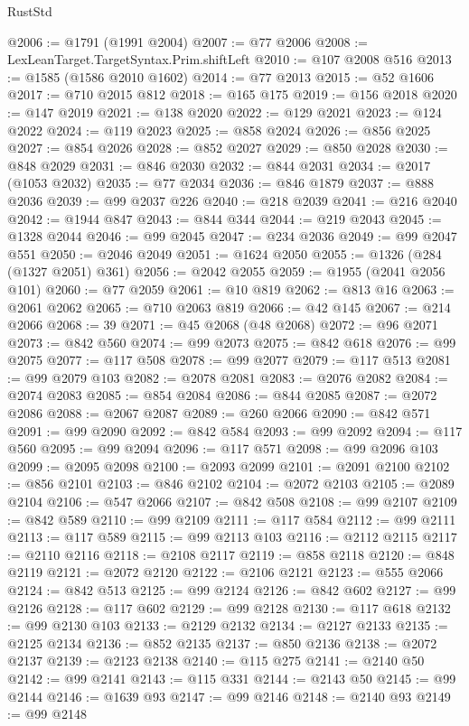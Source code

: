 \begin{lexlean}{RustStd}
\begin{coremodule}
@2006 := @1791 (@1991 @2004)
@2007 := @77 @2006
@2008 := LexLeanTarget.TargetSyntax.Prim.shiftLeft
@2010 := @107 @2008 @516
@2013 := @1585 (@1586 @2010 @1602)
@2014 := @77 @2013
@2015 := @52 @1606
@2017 := @710 @2015 @812
@2018 := @165 @175
@2019 := @156 @2018
@2020 := @147 @2019
@2021 := @138 @2020
@2022 := @129 @2021
@2023 := @124 @2022
@2024 := @119 @2023
@2025 := @858 @2024
@2026 := @856 @2025
@2027 := @854 @2026
@2028 := @852 @2027
@2029 := @850 @2028
@2030 := @848 @2029
@2031 := @846 @2030
@2032 := @844 @2031
@2034 := @2017 (@1053 @2032)
@2035 := @77 @2034
@2036 := @846 @1879
@2037 := @888 @2036
@2039 := @99 @2037 @226
@2040 := @218 @2039
@2041 := @216 @2040
@2042 := @1944 @847
@2043 := @844 @344
@2044 := @219 @2043
@2045 := @1328 @2044
@2046 := @99 @2045
@2047 := @234 @2036
@2049 := @99 @2047 @551
@2050 := @2046 @2049
@2051 := @1624 @2050
@2055 := @1326 (@284 (@1327 @2051) @361)
@2056 := @2042 @2055
@2059 := @1955 (@2041 @2056 @101)
@2060 := @77 @2059
@2061 := @10 @819
@2062 := @813 @16
@2063 := @2061 @2062
@2065 := @710 @2063 @819
@2066 := @42 @145
@2067 := @214 @2066
@2068 := 39
@2071 := @45 @2068 (@48 @2068)
@2072 := @96 @2071
@2073 := @842 @560
@2074 := @99 @2073
@2075 := @842 @618
@2076 := @99 @2075
@2077 := @117 @508
@2078 := @99 @2077
@2079 := @117 @513
@2081 := @99 @2079 @103
@2082 := @2078 @2081
@2083 := @2076 @2082
@2084 := @2074 @2083
@2085 := @854 @2084
@2086 := @844 @2085
@2087 := @2072 @2086
@2088 := @2067 @2087
@2089 := @260 @2066
@2090 := @842 @571
@2091 := @99 @2090
@2092 := @842 @584
@2093 := @99 @2092
@2094 := @117 @560
@2095 := @99 @2094
@2096 := @117 @571
@2098 := @99 @2096 @103
@2099 := @2095 @2098
@2100 := @2093 @2099
@2101 := @2091 @2100
@2102 := @856 @2101
@2103 := @846 @2102
@2104 := @2072 @2103
@2105 := @2089 @2104
@2106 := @547 @2066
@2107 := @842 @508
@2108 := @99 @2107
@2109 := @842 @589
@2110 := @99 @2109
@2111 := @117 @584
@2112 := @99 @2111
@2113 := @117 @589
@2115 := @99 @2113 @103
@2116 := @2112 @2115
@2117 := @2110 @2116
@2118 := @2108 @2117
@2119 := @858 @2118
@2120 := @848 @2119
@2121 := @2072 @2120
@2122 := @2106 @2121
@2123 := @555 @2066
@2124 := @842 @513
@2125 := @99 @2124
@2126 := @842 @602
@2127 := @99 @2126
@2128 := @117 @602
@2129 := @99 @2128
@2130 := @117 @618
@2132 := @99 @2130 @103
@2133 := @2129 @2132
@2134 := @2127 @2133
@2135 := @2125 @2134
@2136 := @852 @2135
@2137 := @850 @2136
@2138 := @2072 @2137
@2139 := @2123 @2138
@2140 := @115 @275
@2141 := @2140 @50
@2142 := @99 @2141
@2143 := @115 @331
@2144 := @2143 @50
@2145 := @99 @2144
@2146 := @1639 @93
@2147 := @99 @2146
@2148 := @2140 @93
@2149 := @99 @2148

\end{coremodule}
\end{lexlean}
